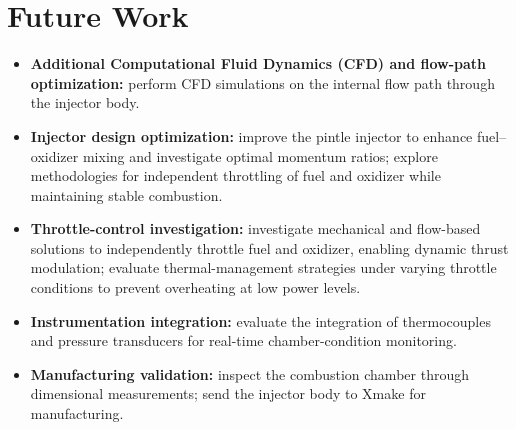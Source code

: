 \section{Future Work}
\begin{itemize}
  \item \textbf{Additional Computational Fluid Dynamics (CFD) and flow-path optimization:}
        perform CFD simulations on the internal flow path through the injector body.
  \item \textbf{Injector design optimization:}
        improve the pintle injector to enhance fuel–oxidizer mixing and investigate optimal momentum ratios; explore methodologies for independent throttling of fuel and oxidizer while maintaining stable combustion.
  \item \textbf{Throttle-control investigation:}
        investigate mechanical and flow-based solutions to independently throttle fuel and oxidizer, enabling dynamic thrust modulation; evaluate thermal-management strategies under varying throttle conditions to prevent overheating at low power levels.
  \item \textbf{Instrumentation integration:}
        evaluate the integration of thermocouples and pressure transducers for real-time chamber-condition monitoring.
  \item \textbf{Manufacturing validation:}
        inspect the combustion chamber through dimensional measurements; send the injector body to Xmake for manufacturing.
\end{itemize}



